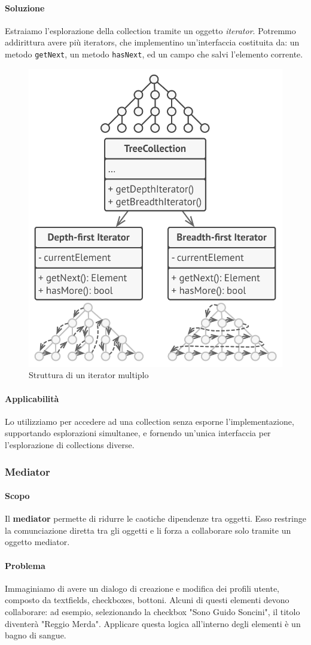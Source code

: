 \documentclass[11pt]{article}
\newcommand{\code}[1]{\texttt{#1}}
\begin{document}
\paragraph{Soluzione}
Estraiamo l'esplorazione della collection tramite un oggetto \textit{iterator}. Potremmo addirittura avere più iterators, che implementino un'interfaccia costituita da: un metodo \code{getNext}, un metodo \code{hasNext}, ed un campo che salvi l'elemento corrente. 
\begin{figure}[H]
    \centering
    \includegraphics[width=0.6\linewidth]{res/teoria/Iterator.png}
    \caption{Struttura di un iterator multiplo}
\end{figure}
\paragraph{Applicabilità}
Lo utilizziamo per accedere ad una collection senza esporne l'implementazione, supportando esplorazioni simultanee, e fornendo un'unica interfaccia per l'esplorazione di collections diverse.
\subsubsection{Mediator}
\paragraph{Scopo}
Il \textbf{mediator} permette di ridurre le caotiche dipendenze tra oggetti. Esso restringe la comunciazione diretta tra gli oggetti e li forza a collaborare solo tramite un oggetto mediator. 

\paragraph{Problema}
Immaginiamo di avere un dialogo di creazione e modifica dei profili utente, composto da textfields, checkboxes, bottoni. Alcuni di questi elementi devono collaborare: ad esempio, selezionando la checkbox "Sono Guido Soncini", il titolo diventerà "Reggio Merda". Applicare questa logica all'interno degli elementi è un bagno di sangue.
\end{document}

